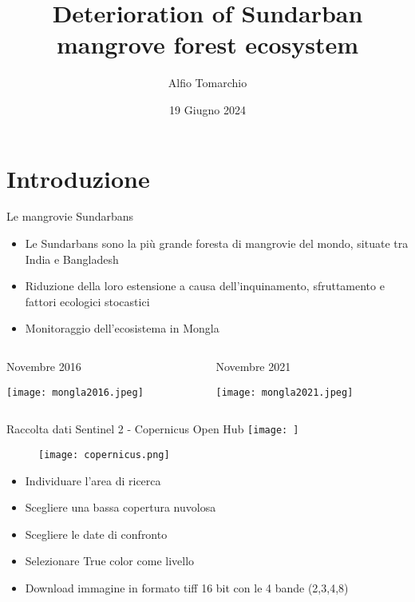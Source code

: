 \documentclass{beamer} %
\title{Deterioration of Sundarban mangrove forest ecosystem}
\author{Alfio Tomarchio}
\date{19 Giugno 2024}
\begin{document}
\maketitle


\section{Introduzione}

        \begin{frame}{Le mangrovie Sundarbans}
            \begin{itemize}
                \item Le Sundarbans sono la più grande foresta di mangrovie del mondo, situate tra India e Bangladesh
                \item Riduzione della loro estensione a causa dell'inquinamento, sfruttamento e fattori ecologici stocastici
                \item Monitoraggio dell'ecosistema in Mongla
\end{itemize}
\begin{columns}
\begin{column}{0.5\textwidth}
\begin{center}
\caption{Novembre 2016}
\bigskip
  \texttt{[image: mongla2016.jpeg]}
    \end{center}
\end{column}
\begin{column}{0.5\textwidth}  
\begin{center}
\caption{Novembre 2021}
\bigskip
\texttt{[image: mongla2021.jpeg]}
\end{center}
\end{column}
\end{columns}

  \end{frame} 


  
        \begin{frame}{Raccolta dati}
Sentinel 2 - Copernicus Open Hub \texttt{[image: ]}
\begin{wrapfigure}{r}{0.25\textwidth} %
    \centering
    \texttt{[image: copernicus.png]}
\end{wrapfigure}
\bigskip
\begin{itemize}
    \item Individuare l'area di ricerca
    \item Scegliere una bassa copertura nuvolosa 
    \item Scegliere le date di confronto
    \item Selezionare True color come livello
    \item Download immagine in formato tiff 16 bit con le 4 bande (2,3,4,8)
\end{itemize}
 \end{frame}
\end{document}
